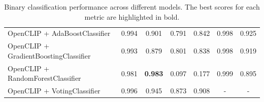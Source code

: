 \begin{table}[ht]
{\begin{tabular}{lcccccc}
OpenCLIP + AdaBoostClassifier         & 0.994             & 0.901              & 0.791           & 0.842             & 0.998          & 0.925          \\
OpenCLIP + GradientBoostingClassifier & 0.993             & 0.879              & 0.801           & 0.838             & 0.998          & 0.919          \\
OpenCLIP + RandomForestClassifier     & 0.981             & \textbf{0.983}     & 0.097           & 0.177             & 0.999          & 0.895          \\
OpenCLIP + VotingClassifier           & 0.996             & 0.945              & 0.873           & 0.908             & -              & -              \\
\bottomrule
\end{tabular}
}
  \caption{Binary classification performance across different models. The best scores for each metric are highlighted in bold.}
\label{tab:binary-results}
\end{table}
